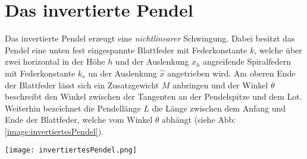 

\section{Das invertierte Pendel}
\label{sec:invertPendel}
Das invertierte Pendel erzeugt eine \textit{nichtlinearer} Schwingung. Dabei besitzt das Pendel eine unten fest eingespannte Blattfeder mit Federkonstante $k$, welche über zwei horizontal in der Höhe $h$ und der Auslenkung $x_h$ angreifende Spiralfedern mit Federkonstante $k_s$ un der Auslenkung $\hat{x}$ angetrieben wird. Am oberen Ende der Blattfeder lässt sich ein Zusatzgewicht $M$ anbringen und der Winkel $\theta$ beschreibt den Winkel zwischen der Tangenten an der Pendelspitze und dem Lot. Weiterhin bezeichnet die Pendellänge $L$ die Länge zwischen dem Anfang und Ende der Blattfeder, welche vom Winkel $\theta$ abhängt (siehe Abb: \ref{image:invertiertesPendel}).
\begin{center}
    \texttt{[image: invertiertesPendel.png]}
    \label{image:invertiertesPendel}
\end{center}
